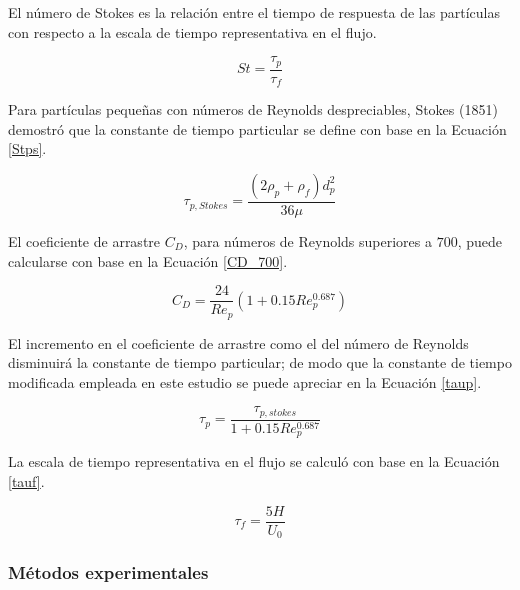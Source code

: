 \noindent
\justify

El n\'umero de Stokes es la relaci\'on entre el tiempo de respuesta de las part\'iculas con respecto a la escala de tiempo representativa en el flujo.

\begin{equation}
	St = \frac{\tau _p}{\tau _f}
	\label{Stp}
\end{equation}

\noindent
\justify

Para part\'iculas peque\~nas con n\'umeros de Reynolds despreciables, Stokes (1851) demostr\'o que la constante de tiempo particular se define con base en la Ecuaci\'on \ref{Stps}.

\begin{equation}
	\tau _{p, Stokes} = \frac{\left(2 \rho _p + \rho _f \right) d_p ^2}{36 \mu}
	\label{Stps}
\end{equation}

\noindent
\justify

El coeficiente de arrastre $C_D$, para n\'umeros de Reynolds superiores a $700$, puede calcularse con base en la Ecuaci\'on \ref{CD_700}.

\begin{equation}
	C_D = \frac{24}{Re_p} \left(1 + 0.15 Re_p ^{0.687} \right)
	\label{CD_700}
\end{equation}

\noindent
\justify

El incremento en el coeficiente de arrastre como el del n\'umero de Reynolds disminuir\'a la constante de tiempo particular; de modo que la constante de tiempo modificada empleada en este estudio se puede apreciar en la Ecuaci\'on \ref{taup}.

\begin{equation}
	\tau _p = \frac{\tau _{p, stokes}}{1 + 0.15 Re_p ^{0.687}}
	\label{taup}
\end{equation}

\noindent
\justify

La escala de tiempo representativa en el flujo se calcul\'o con base en la Ecuaci\'on \ref{tauf}.

\begin{equation}
	\tau _f = \frac{5H}{U_0}
	\label{tauf}
\end{equation}

\subsubsection{M\'etodos experimentales}

